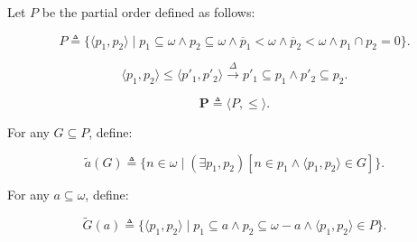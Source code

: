 Let $P$ be the partial order defined as follows:

$$P \triangleq \{ \langle p_1, p_2 \rangle \mid p_1 \subseteq \omega \wedge p_2 \subseteq \omega \wedge \overline{p}_1 < \omega \wedge \overline{p}_2 < \omega \wedge p_1 \cap p_2 = 0 \}.$$

$$\langle p_1, p_2 \rangle \leq \langle p'_1, p'_2 \rangle \xrightarrow{\Delta} p'_1 \subseteq p_1 \wedge p'_2 \subseteq p_2.$$

$$\mathbf{P} \triangleq \langle P, \leq \rangle.$$

For any $G \subseteq P$, define:

$$\tilde{a}(G) \triangleq \{ n \in \omega \mid (\exists p_1, p_2)[n \in p_1 \wedge \langle p_1, p_2 \rangle \in G] \}.$$

For any $a \subseteq \omega$, define:

$$\tilde{G}(a) \triangleq \{ \langle p_1, p_2 \rangle \mid p_1 \subseteq a \wedge p_2 \subseteq \omega - a \wedge \langle p_1, p_2 \rangle \in P \}.$$

